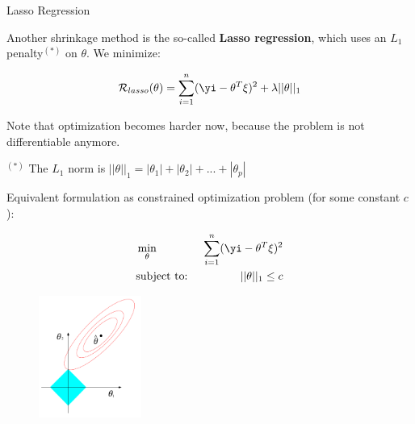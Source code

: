 \begin{vbframe}{Lasso Regression}

Another shrinkage method is the so-called \textbf{Lasso regression},
which uses an \(L_1\) penalty\(^{(*)}\) on \(\theta\). We minimize:

\[
\mathcal{R}_{lasso}(\theta) = \sum_{i=1}^n (\yi - \theta^T \xi)^2 + \lambda ||\theta||_1
\]

Note that optimization becomes harder now, because the problem is not
differentiable anymore.

\vfill

$^{(*)}$ The $L_1$ norm is $||\theta||_1 = |\theta_1| + |\theta_2| + ... + |\theta_p|$

\framebreak

Equivalent formulation as constrained optimization problem (for some constant $c$):

\vspace{-0.8cm}

\begin{eqnarray*}
&\min_{\theta}& \sum_{i=1}^n (\yi - \theta^T \xi)^2 \\
&\text{subject to: }& ||\theta||_1  \leq c \\
\end{eqnarray*}

\begin{figure}
\center
\includegraphics[width=0.3\textwidth]{plots/lasso.png}\\
\end{figure}

\end{vbframe}

